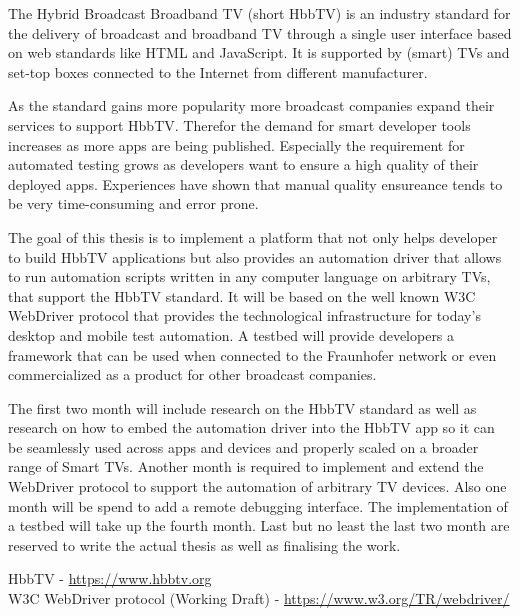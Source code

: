 
The Hybrid Broadcast Broadband TV (short HbbTV) is an industry standard for the delivery of broadcast and broadband TV through a single user interface based on web standards like HTML and JavaScript. It is supported by (smart) TVs and set-top boxes connected to the Internet from different manufacturer.


As the standard gains more popularity more broadcast companies expand their services to support HbbTV. Therefor the demand for smart developer tools increases as more apps are being published. Especially the requirement for automated testing grows as developers want to ensure a high quality of their deployed apps. Experiences have shown that manual quality ensureance tends to be very time-consuming and error prone.


The goal of this thesis is to implement a platform that not only helps developer to build HbbTV applications but also provides an automation driver that allows to run automation scripts written in any computer language on arbitrary TVs, that support the HbbTV standard. It will be based on the well known W3C WebDriver protocol that provides the technological infrastructure for today's desktop and mobile test automation. A testbed will provide developers a framework that can be used when connected to the Fraunhofer network or even commercialized as a product for other broadcast companies.


The first two month will include research on the HbbTV standard as well as research on how to embed the automation driver into the HbbTV app so it can be seamlessly used across apps and devices and properly scaled on a broader range of Smart TVs. Another month is required to implement and extend the WebDriver protocol to support the automation of arbitrary TV devices. Also one month will be spend to add a remote debugging interface. The implementation of a testbed will take up the fourth month. Last but no least the last two month are reserved to write the actual thesis as well as finalising the work.


HbbTV - \url{https://www.hbbtv.org} \\
W3C WebDriver protocol (Working Draft) - \url{https://www.w3.org/TR/webdriver/}
